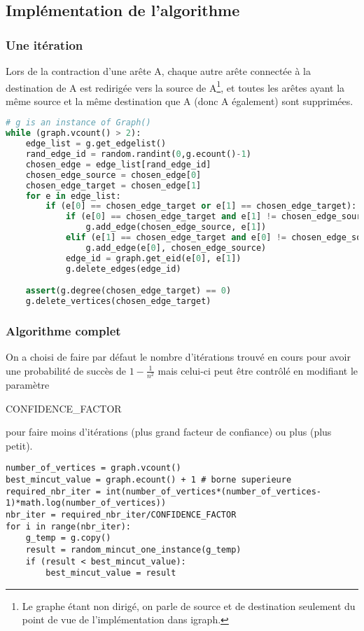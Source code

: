 \documentclass[a4paper,10pt]{article}
\begin{document}
\subsection{Implémentation de l'algorithme}
\subsubsection{Une itération}
Lors de la contraction d'une arête A, chaque autre arête connectée à la destination de A est redirigée vers la source de
A\footnote{Le graphe étant non dirigé, on parle de source et de destination seulement du point de vue de l'implémentation dans igraph.},
et toutes les arêtes ayant la même source et la même destination que A (donc A également) sont supprimées.
\begin{lstlisting}[language=Python]
# g is an instance of Graph()
while (graph.vcount() > 2):
	edge_list = g.get_edgelist()
	rand_edge_id = random.randint(0,g.ecount()-1)
	chosen_edge = edge_list[rand_edge_id]
	chosen_edge_source = chosen_edge[0]
	chosen_edge_target = chosen_edge[1]
	for e in edge_list:
		if (e[0] == chosen_edge_target or e[1] == chosen_edge_target):
			if (e[0] == chosen_edge_target and e[1] != chosen_edge_source):
				g.add_edge(chosen_edge_source, e[1])
			elif (e[1] == chosen_edge_target and e[0] != chosen_edge_source):
				g.add_edge(e[0], chosen_edge_source)
			edge_id = graph.get_eid(e[0], e[1])
			g.delete_edges(edge_id)

	assert(g.degree(chosen_edge_target) == 0)
	g.delete_vertices(chosen_edge_target)
\end{lstlisting}
\fontfamily{}

\subsubsection{Algorithme complet}
On a choisi de faire par défaut le nombre d'itérations trouvé en cours pour avoir une probabilité de succès de
\begin{math} 1-\frac{1}{n^{2}} \end{math}
mais celui-ci peut être contrôlé en modifiant le paramètre
\begin{it}CONFIDENCE\_FACTOR\end{it}
pour faire moins d'itérations (plus grand facteur de confiance) ou plus (plus petit).

\begin{lstlisting}
number_of_vertices = graph.vcount()
best_mincut_value = graph.ecount() + 1 # borne superieure
required_nbr_iter = int(number_of_vertices*(number_of_vertices-1)*math.log(number_of_vertices))
nbr_iter = required_nbr_iter/CONFIDENCE_FACTOR
for i in range(nbr_iter):
	g_temp = g.copy()
	result = random_mincut_one_instance(g_temp)
	if (result < best_mincut_value):
		best_mincut_value = result
\end{lstlisting}
\fontfamily{}
\end{document}
